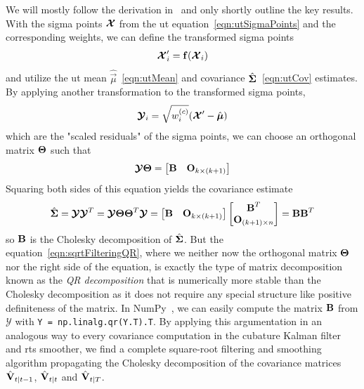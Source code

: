 		We will mostly follow the derivation in~\cite{ruttenSquarerootUnscentedFiltering2013} and only shortly outline the key results. With the sigma points \( \boldsymbol{\mathrm{\mathcal{X}}} \) from the \ac{ut} equation~\eqref{eqn:utSigmaPoints} and the corresponding weights, we can define the transformed sigma points
		\begin{equation*}
			\boldsymbol{\mathrm{\mathcal{X}}}_i' = \boldsymbol{\mathrm{f}}(\boldsymbol{\mathrm{\mathcal{X}}}_i)
		\end{equation*}
		and utilize the \ac{ut} mean \( \hat{\vec{\mu}} \)~\eqref{eqn:utMean} and covariance \( \hat{\boldsymbol{\mathrm{\Sigma}}} \)~\eqref{eqn:utCov} estimates. By applying another transformation to the transformed sigma points,
		\begin{equation*}
			\boldsymbol{\mathrm{\mathcal{Y}}}_i = \sqrt{w_i^{(c)}} (\boldsymbol{\mathrm{\mathcal{X}}}' - \hat{\boldsymbol{\mathrm{\mu}}})
		\end{equation*}
		which are the "scaled residuals" of the sigma points, we can choose an orthogonal matrix \( \boldsymbol{\mathrm{\Theta}} \) such that
		\begin{equation}
			\boldsymbol{\mathrm{\mathcal{Y}}} \boldsymbol{\mathrm{\Theta}} = \begin{bmatrix} \boldsymbol{\mathrm{B}} & \boldsymbol{\mathrm{O}}_{k \times (k + 1)} \end{bmatrix}  \label{eqn:sqrtFilteringQR}
		\end{equation}
		Squaring both sides of this equation yields the covariance estimate
		\begin{equation*}
			\hat{\boldsymbol{\mathrm{\Sigma}}} = \boldsymbol{\mathrm{\mathcal{Y}}} \boldsymbol{\mathrm{\mathcal{Y}}}^T = \boldsymbol{\mathrm{\mathcal{Y}}} \boldsymbol{\mathrm{\Theta}} \boldsymbol{\mathrm{\Theta}}^T \boldsymbol{\mathrm{\mathcal{Y}}} = \begin{bmatrix} \boldsymbol{\mathrm{B}} & \boldsymbol{\mathrm{O}}_{k \times (k + 1)} \end{bmatrix} \begin{bmatrix} \boldsymbol{\mathrm{B}}^T \\ \boldsymbol{\mathrm{O}}_{(k + 1) \times n} \end{bmatrix} = \boldsymbol{\mathrm{B}} \boldsymbol{\mathrm{B}}^T
		\end{equation*}
		so \( \boldsymbol{\mathrm{B}} \) is the Cholesky decomposition of \( \hat{\boldsymbol{\mathrm{\Sigma}}} \). But the equation~\eqref{eqn:sqrtFilteringQR}, where we neither now the orthogonal matrix \( \boldsymbol{\mathrm{\Theta}} \) nor the right side of the equation, is exactly the type of matrix decomposition known as the \emph{QR decomposition} that is numerically more stable than the Cholesky decomposition as it does not require any special structure like positive definiteness of the matrix. In NumPy~\cite{harrisArrayProgrammingNumPy2020}, we can easily compute the matrix \( \boldsymbol{\mathrm{B}} \) from \( \mathbb{\mathcal{Y}} \) with \lstinline|Y = np.linalg.qr(Y.T).T|. By applying this argumentation in an analogous way to every covariance computation in the cubature Kalman filter and \ac{rts} smoother, we find a complete square-root filtering and smoothing algorithm propagating the Cholesky decomposition of the covariance matrices \( \hat{\boldsymbol{\mathrm{V}}}_{t \vert t - 1} \), \( \hat{\boldsymbol{\mathrm{V}}}_{t \vert t} \) and \( \hat{\boldsymbol{\mathrm{V}}}_{t \vert T} \).

